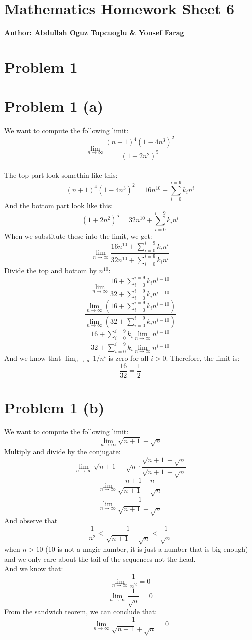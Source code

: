 \documentclass{article}
\begin{document}
\section*{\huge Mathematics Homework Sheet 6}
\begin{flushright}
   \textbf{Author: Abdullah Oguz Topcuoglu \& Yousef Farag}
\end{flushright}

\section*{Problem 1}
\section*{Problem 1 (a)}
We want to compute the following limit:
\[
   \lim_{n \rightarrow \infty} \frac{(n+1)^4(1 - 4n^3)^2}{(1+2n^2)^5}
\]
\\
The top part look somethin like this:
\[
   (n+1)^4(1 - 4n^3)^2 = 16n^{10} + \sum_{i = 0}^{i = 9} k_in^i
\]
And the bottom part look like this:
\[
   (1+2n^2)^5 = 32n^{10} + \sum_{i = 0}^{i = 9} k_in^i
\]
When we substitute these into the limit, we get:
\[
   \lim_{n \rightarrow \infty} \frac{16n^{10} + \sum_{i = 0}^{i = 9} k_in^i}{32n^{10} + \sum_{i = 0}^{i = 9} k_in^i}
\]
Divide the top and bottom by $n^{10}$:
\[
   \lim_{n \rightarrow \infty} \frac{16 + \sum_{i = 0}^{i = 9} k_in^{i-10}}{32 + \sum_{i = 0}^{i = 9} k_in^{i-10}}
\]
\[
   \frac{\lim_{n \rightarrow \infty}(16 + \sum_{i = 0}^{i = 9} k_in^{i-10})}{\lim_{n \rightarrow \infty}(32 + \sum_{i = 0}^{i = 9} k_in^{i-10})}
\]
\[
   \frac{16 + \sum_{i = 0}^{i = 9} k_i\lim_{n \rightarrow \infty}n^{i-10}}{32 + \sum_{i = 0}^{i = 9} k_i\lim_{n \rightarrow \infty}n^{i-10}}
\]
And we know that \(\lim_{n \rightarrow \infty} 1/n^i\) is zero for all \(i > 0\). Therefore, the limit is:
\[
   \frac{16}{32} = \frac{1}{2}
\]

\section*{Problem 1 (b)}
We want to compute the following limit:
\[
   \lim_{n \rightarrow \infty} \sqrt{n+1} - \sqrt{n}
\]
Multiply and divide by the conjugate:
\[
   \lim_{n \rightarrow \infty} \sqrt{n+1} - \sqrt{n} \cdot \frac{\sqrt{n+1} + \sqrt{n}}{\sqrt{n+1} + \sqrt{n}}
\]
\[
   \lim_{n \rightarrow \infty} \frac{n+1 - n}{\sqrt{n+1} + \sqrt{n}}
\]
\[
   \lim_{n \rightarrow \infty} \frac{1}{\sqrt{n+1} + \sqrt{n}}
\]
And observe that
\[
   \frac{1}{n^2} < \frac{1}{\sqrt{n+1} + \sqrt{n}} < \frac{1}{\sqrt{n}}
\]
when \(n > 10\) (10 is not a magic number, it is just a number that is big enough) 
and we only care about the tail of the sequences not the head.\\
And we know that:
\[
   \lim_{n \rightarrow \infty} \frac{1}{n^2} = 0
\]
\[
   \lim_{n \rightarrow \infty} \frac{1}{\sqrt{n}} = 0
\]
From the sandwich teorem, we can conclude that:
\[
   \lim_{n \rightarrow \infty} \frac{1}{\sqrt{n+1} + \sqrt{n}} = 0
\]
\end{document}
